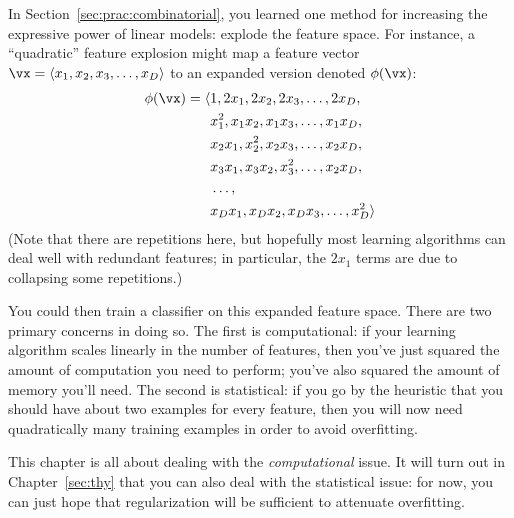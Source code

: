 In Section~\ref{sec:prac:combinatorial}, you learned one method for
increasing the expressive power of linear models: explode the feature
space.  For instance, a ``quadratic'' feature explosion might map a
feature vector $\vx = \langle x_1, x_2, x_3, \dots, x_D \rangle$ to an
expanded version denoted $\phi(\vx)$:
%
\begin{align}
  \phi(\vx) = \langle &1, 2x_1, 2x_2, 2x_3, \dots, 2x_D, \nonumber\\
  & x_1^2, x_1 x_2, x_1 x_3, \dots, x_1 x_D, \nonumber\\
  & x_2 x_1, x_2^2, x_2 x_3, \dots, x_2 x_D, \nonumber\\
  & x_3 x_1, x_3 x_2, x_3^2, \dots, x_2 x_D, \nonumber\\
  & \dots, \nonumber\\
  & x_D x_1, x_D x_2, x_D x_3, \dots, x_D^2 \rangle
\end{align}
%
(Note that there are repetitions here, but hopefully most learning
algorithms can deal well with redundant features; in particular, the
$2x_1$ terms are due to collapsing some repetitions.)

You could then train a classifier on this expanded feature space.
There are two primary concerns in doing so.  The first is
computational: if your learning algorithm scales linearly in the
number of features, then you've just squared the amount of computation
you need to perform; you've also squared the amount of memory you'll
need.  The second is statistical: if you go by the heuristic that you
should have about two examples for every feature, then you will now
need quadratically many training examples in order to avoid
overfitting.

This chapter is all about dealing with the \emph{computational} issue.
It will turn out in Chapter~\ref{sec:thy} that you can also deal with
the statistical issue: for now, you can just hope that regularization
will be sufficient to attenuate overfitting.

